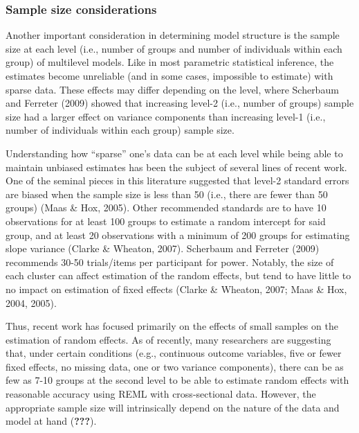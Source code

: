 \documentclass[
  english,
  man]{apa6}
\begin{document}
\hypertarget{sample-size-considerations}{%
\subsubsection{Sample size considerations}\label{sample-size-considerations}}

Another important consideration in determining model structure is the sample size at each level (i.e., number of groups and number of individuals within each group) of multilevel models. Like in most parametric statistical inference, the estimates become unreliable (and in some cases, impossible to estimate) with sparse data. These effects may differ depending on the level, where Scherbaum and Ferreter (2009) showed that increasing level-2 (i.e., number of groups) sample size had a larger effect on variance components than increasing level-1 (i.e., number of individuals within each group) sample size.

Understanding how \enquote{sparse} one's data can be at each level while being able to maintain unbiased estimates has been the subject of several lines of recent work. One of the seminal pieces in this literature suggested that level-2 standard errors are biased when the sample size is less than 50 (i.e., there are fewer than 50 groups) (Maas \& Hox, 2005). Other recommended standards are to have 10 observations for at least 100 groups to estimate a random intercept for said group, and at least 20 observations with a minimum of 200 groups for estimating slope variance (Clarke \& Wheaton, 2007). Scherbaum and Ferreter (2009) recommends 30-50 trials/items per participant for power. Notably, the size of each cluster can affect estimation of the random effects, but tend to have little to no impact on estimation of fixed effects (Clarke \& Wheaton, 2007; Maas \& Hox, 2004, 2005).

Thus, recent work has focused primarily on the effects of small samples on the estimation of random effects. As of recently, many researchers are suggesting that, under certain conditions (e.g., continuous outcome variables, five or fewer fixed effects, no missing data, one or two variance components), there can be as few as 7-10 groups at the second level to be able to estimate random effects with reasonable accuracy using REML with cross-sectional data. However, the appropriate sample size will intrinsically depend on the nature of the data and model at hand ({\textbf{???}}).
\end{document}
